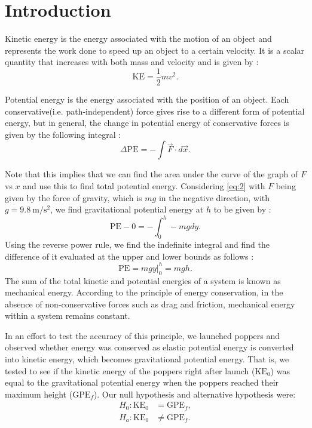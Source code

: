 \documentclass[reprint,amsmath,amssymb,aps,twoside]{revtex4-2} %
\begin{document}
\section{Introduction}
Kinetic energy is the energy associated with the motion of an object and represents the work done to speed up an object to a certain velocity. It is a scalar quantity that increases with both mass and velocity and is given by \cite{tipler,barrons,openstax}:
\begin{equation}
\text{KE} = \frac{1}{2}mv^2.
\label{eq:1}
\end{equation}

Potential energy is the energy associated with the position of an object. Each conservative(i.e. path-independent) force gives rise to a different form of potential energy, but in general, the change in potential energy of conservative forces is given by the following integral \cite{tipler,barrons,openstax}:
\begin{equation}
\Delta \text{PE} = -\int\vec{F}\cdot d \vec{x}.
\label{eq:2}
\end{equation}

Note that this implies that we can find the area under the curve of the graph of $F$ vs $x$ and use this to find total potential energy. Considering \cref{eq:2} with $F$ being given by the force of gravity, which is $mg$ in the negative direction, with $g=\qty{9.8}{\meter\per\second\squared}$, we find gravitational potential energy at $h$ to be given by \cite{tipler,barrons,openstax}:
\begin{equation}
\text{PE} - 0 = -\int_0^h -mg dy. 
\label{eq:3}
\end{equation}
Using the reverse power rule, we find the indefinite integral and find the difference of it evaluated at the upper and lower bounds as follows \cite{tipler,barrons,openstax}:
\begin{equation}
\text{PE} = mgy \bigg|^h_0 = mgh.
\label{eq:4}
\end{equation}
The sum of the total kinetic and potential energies of a system is known as mechanical energy. According to the principle of energy conservation, in the absence of non-conservative forces such as drag and friction, mechanical energy within a system remains constant. 

In an effort to test the accuracy of this principle, we launched poppers and observed whether energy was conserved as elastic potential energy is converted into kinetic energy, which becomes gravitational potential energy. That is, we tested to see if the kinetic energy of the poppers right after launch ($\text{KE}_0$) was equal to the gravitational potential energy when the poppers reached their maximum height ($\text{GPE}_f$). Our null hypothesis and alternative hypothesis were:
\begin{align}
H_0 : \text{KE}_0 &= \text{GPE}_f, \\
H_a : \text{KE}_0 &\neq \text{GPE}_f.
\end{align}
\end{document}
